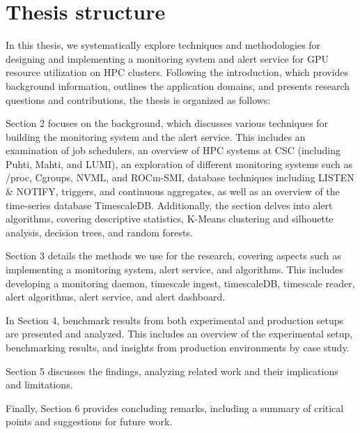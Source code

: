 \section{Thesis structure}

In this thesis, we systematically explore techniques and methodologies for designing and implementing a monitoring system and alert service for GPU resource utilization on HPC clusters. Following the introduction, which provides background information, outlines the application domains, and presents research questions and contributions, the thesis is organized as follows:

Section 2 focuses on the background, which discusses various techniques for building the monitoring system and the alert service. This includes an examination of job schedulers, an overview of HPC systems at CSC (including Puhti, Mahti, and LUMI), an exploration of different monitoring systems such as /proc, Cgroups, NVML, and ROCm-SMI, database techniques including LISTEN \& NOTIFY, triggers, and continuous aggregates, as well as an overview of the time-series database TimescaleDB. Additionally, the section delves into alert algorithms, covering descriptive statistics, K-Means clustering and silhouette analysis, decision trees, and random forests.

Section 3 details the methods we use for the research, covering aspects such as implementing a monitoring system, alert service, and algorithms. This includes developing a monitoring daemon, timescale ingest, timescaleDB, timescale reader, alert algorithms, alert service, and alert dashboard.

In Section 4, benchmark results from both experimental and production setups are presented and analyzed. This includes an overview of the experimental setup, benchmarking results, and insights from production environments by case study.

Section 5 discusses the findings, analyzing related work and their implications and limitations.

Finally, Section 6 provides concluding remarks, including a summary of critical points and suggestions for future work.
